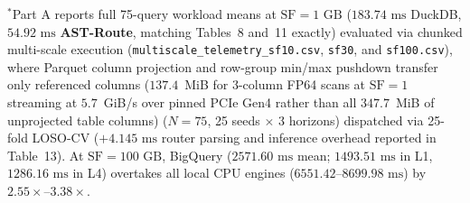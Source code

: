 \documentclass[10pt,a4paper]{article}
\newenvironment{fitasttable}{%
  \begin{lrbox}{\asttblbox}%
}{%
  \end{lrbox}%
  \sbox{\asttblboxB}{%
    \ifdim\wd\asttblbox>0.96\textwidth
      \resizebox{0.96\textwidth}{!}{\usebox{\asttblbox}}%
    \else
      \usebox{\asttblbox}%
    \fi
  }%
  \ifdim\ht\asttblboxB>0.72\textheight
    \resizebox{!}{0.72\textheight}{\usebox{\asttblboxB}}%
  \else
    \usebox{\asttblboxB}%
  \fi
}
\begin{document}
\begin{table}[!htbp]
\begin{fitasttable}
\begin{tabular}{@{}llcccccccl@{}}
\bottomrule
\end{tabular}
\end{fitasttable}%
\vspace{2pt}
\parbox{0.96\textwidth}{\scriptsize $^{*}$Part A reports full 75-query workload means at $\text{SF}=1\text{ GB}$ ($183.74\text{ ms}$ DuckDB, $54.92\text{ ms}$ \textbf{AST-Route}, matching Tables~8 and~11 exactly) evaluated via chunked multi-scale execution (\texttt{multiscale\_\allowbreak{}telemetry\_\allowbreak{}sf10.csv}, \texttt{sf30}, and \texttt{sf100.csv}), where Parquet column projection and row-group min/max pushdown transfer only referenced columns ($137.4$~MiB for 3-column FP64 scans at $\mathrm{SF}=1$ streaming at $5.7$~GiB/s over pinned PCIe Gen4 rather than all $347.7$~MiB of unprojected table columns) ($N=75$, 25 seeds $\times$ 3 horizons) dispatched via 25-fold LOSO-CV ($+4.145\text{ ms}$ router parsing and inference overhead reported in Table~13). At $\text{SF}=100\text{ GB}$, BigQuery ($2571.60\text{ ms}$ mean; $1493.51\text{ ms}$ in L1, $1286.16\text{ ms}$ in L4) overtakes all local CPU engines ($6551.42\text{--}8699.98\text{ ms}$) by $\mathbf{2.55\times\text{--}3.38\times}$.}
\end{table}
\end{document}
